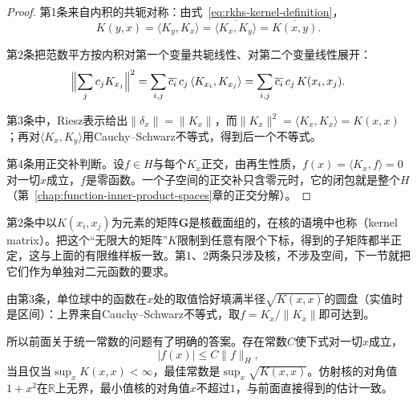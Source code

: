 \begin{proof}
第1条来自内积的共轭对称：由式~\eqref{eq:rkhs-kernel-definition}，
\[
K(y,x)=\langle K_y,K_x\rangle=\overline{\langle K_x,K_y\rangle}=\overline{K(x,y)} .
\]

第2条把范数平方按内积对第一个变量共轭线性、对第二个变量线性展开：
\[
\Bigl\lVert\sum_jc_jK_{x_j}\Bigr\rVert^2=\sum_{i,j}\overline{c_i}\,c_j\,\langle K_{x_i},K_{x_j}\rangle=\sum_{i,j}\overline{c_i}\,c_j\,K(x_i,x_j).
\]

第3条中，Riesz表示给出$\lVert\delta_x\rVert=\lVert K_x\rVert$，而$\lVert K_x\rVert^2=\langle K_x,K_x\rangle=K(x,x)$；再对$\langle K_x,K_y\rangle$用Cauchy--Schwarz不等式，得到后一个不等式。

第4条用正交补判断。设$f\in H$与每个$K_x$正交，由再生性质，$f(x)=\langle K_x,f\rangle=0$对一切$x$成立，$f$是零函数。一个子空间的正交补只含零元时，它的闭包就是整个$H$（第~\ref{chap:function-inner-product-spaces}章的正交分解）。
\end{proof}

第2条中以$K(x_i,x_j)$为元素的矩阵$\bm G$是核截面组的，在核的语境中也称（kernel matrix）。把这个“无限大的矩阵”$K$限制到任意有限个下标，得到的子矩阵都半正定，这与上面的有限维样板一致。第1、2两条只涉及核，不涉及空间，下一节就把它们作为单独对二元函数的要求。

由第3条，单位球中的函数在$x$处的取值恰好填满半径$\sqrt{K(x,x)}$的圆盘（实值时是区间）：上界来自Cauchy--Schwarz不等式，取$f=K_x/\lVert K_x\rVert$即可达到。

所以前面关于统一常数的问题有了明确的答案。存在常数$C$使下式对一切$x$成立，
\[
\lvert f(x)\rvert\leq C\lVert f\rVert_H ,
\]
当且仅当$\sup_xK(x,x)<\infty$，最佳常数是$\sup_x\sqrt{K(x,x)}$。仿射核的对角值$1+x^2$在$\mathbb R$上无界，最小值核的对角值$x$不超过$1$，与前面直接得到的估计一致。
